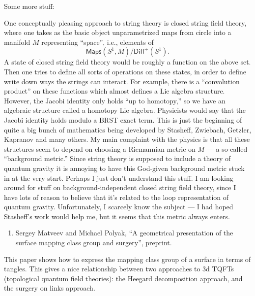 \documentclass[12pt]{article}
\def\tightlist{}
\renewcommand{\texttt}[1]{%
  \begingroup
  \ttfamily
  \begingroup\lccode`~=`/\lowercase{\endgroup\def~}{/\discretionary{}{}{}}%
  \begingroup\lccode`~=`[\lowercase{\endgroup\def~}{[\discretionary{}{}{}}%
  \begingroup\lccode`~=`.\lowercase{\endgroup\def~}{.\discretionary{}{}{}}%
  \catcode`/=\active\catcode`[=\active\catcode`.=\active
  \scantokens{#1\noexpand}%
  \endgroup
}
\begin{document}
Some more stuff:

\noindent
One conceptually pleasing approach to string theory is closed string
field theory, where one takes as the basic object unparametrized maps
from circle into a manifold \(M\) representing ``space'', i.e., elements
of \[\mathsf{Maps}(S^1,M)/\mathsf{Diff}^+(S^1).\] A state of closed
string field theory would be roughly a function on the above set. Then
one tries to define all sorts of operations on these states, in order to
define write down ways the strings can interact. For example, there is a
``convolution product'' on these functions which almost defines a Lie
algebra structure. However, the Jacobi identity only holds ``up to
homotopy,'' so we have an algebraic structure called a homotopy Lie
algebra. Physicists would say that the Jacobi identity holds modulo a
BRST exact term. This is just the beginning of quite a big bunch of
mathematics being developed by Stasheff, Zwiebach, Getzler, Kapranov and
many others. My main complaint with the physics is that all these
structures seem to depend on choosing a Riemannian metric on \(M\) --- a
so-called ``background metric.'' Since string theory is supposed to
include a theory of quantum gravity it is annoying to have this
God-given background metric stuck in at the very start. Perhaps I just
don't understand this stuff. I am looking around for stuff on
background-independent closed string field theory, since I have lots of
reason to believe that it's related to the loop representation of
quantum gravity. Unfortunately, I scarcely know the subject --- I had
hoped Stasheff's work would help me, but it seems that this metric
always enters.

\begin{enumerate}
\def\labelenumi{\arabic{enumi})}
\setcounter{enumi}{4}
\tightlist
\item
  Sergey Matveev and Michael Polyak, ``A geometrical presentation of the surface mapping 
  class group and surgery'', preprint.
\end{enumerate}
\noindent
This paper shows how to express the mapping class group of a surface in
terms of tangles. This gives a nice relationship between two approaches
to 3d TQFTs (topological quantum field theories): the Heegard
decomposition approach, and the surgery on links approach.
\end{document}
